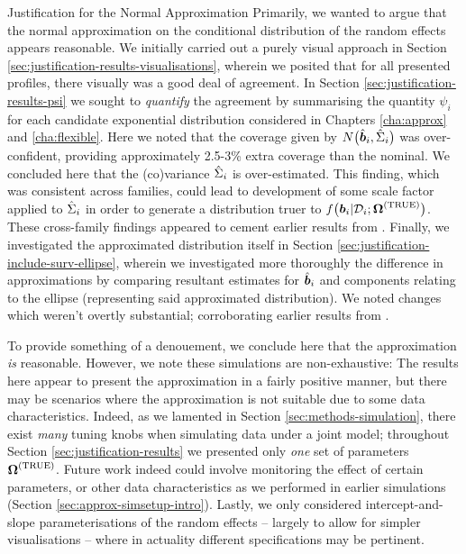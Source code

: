 \begin{chapter}{\label{cha:justification}Justification for the Normal Approximation}
  Primarily, we wanted to argue that the normal approximation on the conditional distribution of the random effects appears reasonable. We initially carried out a purely visual approach in Section \ref{sec:justification-results-visualisations}, wherein we posited that for all presented profiles, there visually was a good deal of agreement.\newline
  In Section \ref{sec:justification-results-psi} we sought to \textit{quantify} the agreement by summarising the quantity $\psi_i$ for each candidate exponential distribution considered in Chapters \ref{cha:approx} and \ref{cha:flexible}. Here we noted that the coverage given by $N\big(\hat{\bm{b}}_i,\hat{\Sigma}_i\big)$ was over-confident, providing approximately 2.5-3\% extra coverage than the nominal. We concluded here that the (co)variance $\hat{\Sigma}_i$ is over-estimated. This finding, which was consistent across families, could lead to development of some scale factor applied to $\hat{\Sigma}_i$ in order to generate a distribution truer to $f\big(\bm{b}_i|\mathcal{D}_i;\bm{\mathrm{\Omega}}^{(\mathrm{TRUE})}\big)$. These cross-family findings appeared to cement earlier results from \citet{baghishani2012}.\newline
  Finally, we investigated the approximated distribution itself in Section \ref{sec:justification-include-surv-ellipse}, wherein we investigated more thoroughly the difference in approximations by comparing resultant estimates for $\hat{\bm{b}}_i$ and components relating to the ellipse (representing said approximated distribution). We noted changes which weren't overtly substantial; corroborating earlier results from \citet{Rizopoulos2012}.
  
  To provide something of a denouement, we conclude here that the approximation \textit{is} reasonable. However, we note these simulations are non-exhaustive: The results here appear to present the approximation in a fairly positive manner, but there may be scenarios where the approximation is not suitable \eg due to some data characteristics. Indeed, as we lamented in Section \ref{sec:methods-simulation}, there exist \textit{many} tuning knobs when simulating data under a joint model; throughout Section \ref{sec:justification-results} we presented only \textit{one} set of parameters $\bm{\mathrm{\Omega}}^{(\mathrm{TRUE})}$. Future work indeed could involve monitoring the effect of certain parameters, or other data characteristics as we performed in earlier simulations (\eg Section \ref{sec:approx-simsetup-intro}). Lastly, we only considered intercept-and-slope parameterisations of the random effects -- largely to allow for simpler visualisations -- where in actuality different specifications may be pertinent.


\end{chapter}
